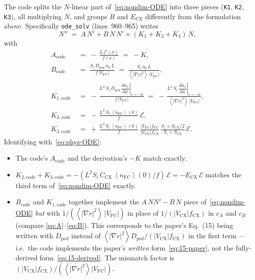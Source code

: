 \documentclass[11pt]{article}
\renewcommand{\ne}{n_{e}}  %
\newcommand{\nfc}{n_{\mathrm{FC}}}
\newcommand{\Vfc}{\lvert V_{\mathrm{FC}}\rvert}
\newcommand{\Vcx}{\lvert V_{\mathrm{CX}}\rvert}
\newcommand{\Si}{S_{i}}
\newcommand{\Scx}{S_{\mathrm{CX}}}
\newcommand{\Dped}{D_{\mathrm{ped}}}
\newcommand{\fFC}{f_{\mathrm{FC}}}
\newcommand{\fCX}{f_{\mathrm{CX}}}
\newcommand{\fsa}[1]{\left\langle #1 \right\rangle}
\newcommand{\gradrsq}{\fsa{|\nabla r|^{2}}}
\newcommand{\neginf}{x=-\infty}
\newcommand{\dneneg}{\left.\dfrac{d\ne}{dx}\right|_{\neginf}}
\newcommand{\nFCzero}{\fsa{\nfc}(0)}
\newcommand{\Ccx}{C_{\mathrm{CX}}}
\newcommand{\Ecx}{E_{\mathrm{CX}}}
\begin{document}
The code splits the $N$-linear part of~\eqref{eq:nondim-ODE} into three
pieces (\texttt{K1}, \texttt{K2}, \texttt{K3}), all multiplying $N$, and
groups $B$ and $\Ecx$ differently from the formulation above.
Specifically \texttt{ode\_solv} (lines~960--965) writes
\begin{equation}
  N'' \;=\; A\,N' + B\,N\,N' + (K_{1}+K_{2}+K_{3})\,N,
  \label{eq:code-ODE}
\end{equation}
with
\begin{align}
  A_{\text{code}}        &\;=\; -\,\frac{L\,f'(x)}{f(x)} \;=\; -K, \label{eq:Acode}\\[4pt]
  B_{\text{code}}        &\;=\; \frac{\Si\,\Dped\,n_{0}\,L}{f\,\Vfc}
                              \;=\; \frac{\Si\,n_{0}\,L}{\gradrsq\,\Vfc}, \label{eq:Bcode}\\[4pt]
  K_{1,\text{code}}      &\;=\; -\,\frac{L^{2}\,\Si\,\Dped\,\dneneg}{f\,\Vfc}
                              \;=\; -\,\frac{L^{2}\,\Si\,\dneneg}{\gradrsq\,\Vfc}, \label{eq:K1code}\\[4pt]
  K_{2,\text{code}}      &\;=\; -\,\frac{L^{2}\,\Si\,\nFCzero}{f}\,\mathcal{E}, \label{eq:K2code}\\[4pt]
  K_{3,\text{code}}      &\;=\; +\,\frac{L^{2}\,\Si\,\nFCzero}{f}\,
                                \frac{\Vfc\fFC}{\Vcx\fCX}\,\frac{\Si+\Scx/2}{\Si+\Scx}\,\mathcal{E}. \label{eq:K3code}
\end{align}
Identifying with~\eqref{eq:phys-ODE}:
\begin{itemize}
  \item The code's $A_{\text{code}}$ and the derivation's $-K$ match exactly.
  \item $K_{2,\text{code}}+K_{3,\text{code}}=
        -(L^{2}\Si\,\Ccx\,\nFCzero/f)\,\mathcal{E}=-\Ecx\,\mathcal{E}$ matches the
        third term of~\eqref{eq:nondim-ODE} exactly.
  \item $B_{\text{code}}$ and $K_{1,\text{code}}$ together implement the
        $A\,NN' - B\,N$ piece of~\eqref{eq:nondim-ODE} \emph{but} with
        $1/(\gradrsq\,\Vfc)$ in place of $1/(\Vcx\fCX)$ in $c_A$ and
        $c_B$ (compare \eqref{eq:A}--\eqref{eq:B}).  This corresponds to
        the paper's Eq.~(15) being written with $\Dped$ instead of
        $\gradrsq\Dped/(\Vcx\fCX)$ in the first term --- i.e.\ the code
        implements the paper's \emph{written} form~\eqref{eq:15-paper},
        not the fully-derived form~\eqref{eq:15-derived}.  The mismatch
        factor is $(\Vcx\fCX)/(\gradrsq\Vfc)$.
\end{itemize}
\end{document}
